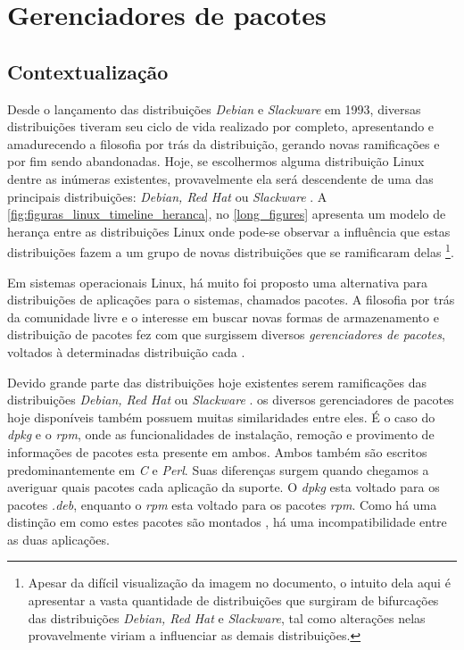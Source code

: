 \section{Gerenciadores de pacotes} %
\label{sec:distribui_es_abordadas}

\subsection{Contextualização} %
\label{sec:breve_descri_o}

Desde o lançamento das distribuições \textit{Debian} e \textit{Slackware} em 1993, diversas distribuições tiveram seu ciclo de vida realizado por completo, apresentando e amadurecendo a filosofia por trás da distribuição, gerando novas ramificações e por fim sendo abandonadas. Hoje, se escolhermos alguma distribuição Linux dentre as inúmeras existentes, provavelmente ela será descendente de uma das principais distribuições: \textit{Debian, Red Hat} ou \textit{Slackware}
.%
A \autoref{fig:figuras_linux_timeline_heranca}, no \autoref{long_figures} apresenta um modelo de herança entre as distribuições Linux onde pode-se observar a influência que estas distribuições fazem a um grupo de novas distribuições que se ramificaram delas
\footnote{Apesar da difícil visualização da imagem no documento, o intuito dela aqui é apresentar a vasta quantidade de distribuições que surgiram de bifurcações das distribuições \textit{Debian, Red Hat} e \textit{Slackware}, tal como alterações nelas provavelmente viriam a influenciar as demais distribuições.}.

Em sistemas operacionais Linux, há muito foi proposto uma alternativa para distribuições de aplicações para o sistemas, chamados pacotes. A filosofia por trás da comunidade livre \cite{bretthauer2001open} e o interesse em buscar novas formas de armazenamento e distribuição de pacotes fez com que surgissem diversos \textit{gerenciadores de pacotes}, voltados à determinadas distribuição  cada \cite{beck2002linux}.

Devido grande parte das distribuições hoje existentes serem ramificações das distribuições \textit{Debian, Red Hat} ou \textit{Slackware} 
.%
os diversos gerenciadores de pacotes hoje disponíveis também possuem muitas similaridades entre eles.
É o caso do \textit{dpkg} e o \textit{rpm}, onde as funcionalidades de instalação, remoção e provimento de informações de pacotes esta presente em ambos. Ambos também são escritos predominantemente em \textit{C} e \textit{Perl}. Suas diferenças surgem quando chegamos a averiguar quais pacotes cada aplicação da suporte. O \textit{dpkg} esta voltado para os pacotes \textit{.deb}, enquanto o \textit{rpm} esta voltado para os pacotes \textit{rpm}. Como há uma distinção em como estes pacotes são montados \cite{bailey1997maximum}, há uma incompatibilidade entre as duas aplicações. 


